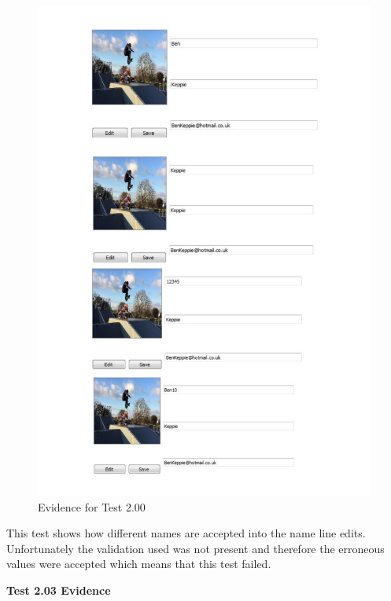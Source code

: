 \begin{figure}[H]
    \includegraphics[width=\textwidth]{./Testing/AnnotatedSamples/Test200.pdf}
    \caption{Evidence for Test 2.00} \label{fig:Test 2.00}
\end{figure}

This test shows how different names are accepted into the name line edits. Unfortunately the validation used was not present and therefore the erroneous values were accepted which means that this test failed.

\textbf{Test 2.03 Evidence}

